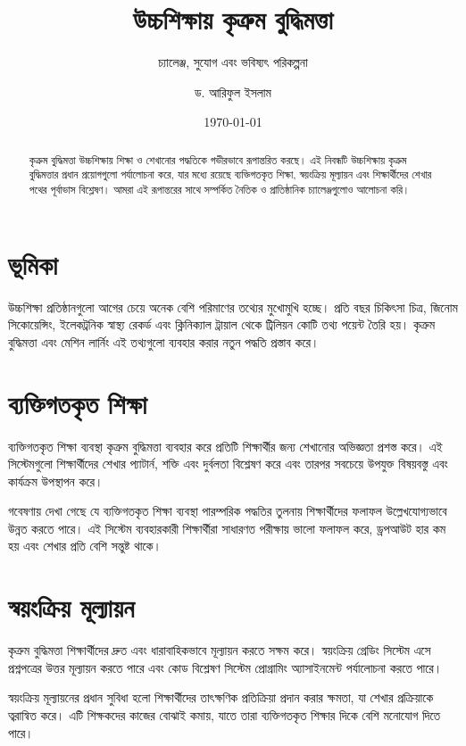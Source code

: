 \documentclass[
    language=bengali,
    doctype=article,
]{../../omnilatex}
\title{উচ্চশিক্ষায় কৃত্রুম বুদ্ধিমত্তা}
\subtitle{চ্যালেঞ্জ, সুযোগ এবং ভবিষ্যৎ পরিকল্পনা}
\author{ড. আরিফুল ইসলাম}
\date{\today}
\begin{document}
\maketitle

\begin{abstract}
কৃত্রুম বুদ্ধিমত্তা উচ্চশিক্ষায় শিক্ষা ও শেখানোর পদ্ধতিকে গভীরভাবে রূপান্তরিত করছে। এই নিবন্ধটি উচ্চশিক্ষায় কৃত্রুম বুদ্ধিমত্তার প্রধান প্রয়োগগুলো পর্যালোচনা করে, যার মধ্যে রয়েছে ব্যক্তিগতকৃত শিক্ষা, স্বয়ংক্রিয় মূল্যায়ন এবং শিক্ষার্থীদের শেখার পথের পূর্বাভাস বিশ্লেষণ। আমরা এই রূপান্তরের সাথে সম্পর্কিত নৈতিক ও প্রাতিষ্ঠানিক চ্যালেঞ্জগুলোও আলোচনা করি।
\end{abstract}

\section{ভূমিকা}
উচ্চশিক্ষা প্রতিষ্ঠানগুলো আগের চেয়ে অনেক বেশি পরিমাণের তথ্যের মুখোমুখি হচ্ছে। প্রতি বছর চিকিৎসা চিত্র, জিনোম সিকোয়েন্সিং, ইলেকট্রনিক স্বাস্থ্য রেকর্ড এবং ক্লিনিক্যাল ট্রায়াল থেকে ট্রিলিয়ন কোটি তথ্য পয়েন্ট তৈরি হয়। কৃত্রুম বুদ্ধিমত্তা এবং মেশিন লার্নিং এই তথ্যগুলো ব্যবহার করার নতুন পদ্ধতি প্রস্তাব করে।

\section{ব্যক্তিগতকৃত শিক্ষা}
ব্যক্তিগতকৃত শিক্ষা ব্যবস্থা কৃত্রুম বুদ্ধিমত্তা ব্যবহার করে প্রতিটি শিক্ষার্থীর জন্য শেখানোর অভিজ্ঞতা প্রশস্ত করে। এই সিস্টেমগুলো শিক্ষার্থীদের শেখার প্যাটার্ন, শক্তি এবং দুর্বলতা বিশ্লেষণ করে এবং তারপর সবচেয়ে উপযুক্ত বিষয়বস্তু এবং কার্যক্রম উপস্থাপন করে।

গবেষণায় দেখা গেছে যে ব্যক্তিগতকৃত শিক্ষা ব্যবস্থা পারম্পরিক পদ্ধতির তুলনায় শিক্ষার্থীদের ফলাফল উল্লেখযোগ্যভাবে উন্নত করতে পারে। এই সিস্টেম ব্যবহারকারী শিক্ষার্থীরা সাধারণত পরীক্ষায় ভালো ফলাফল করে, ড্রপআউট হার কম হয় এবং শেখার প্রতি বেশি সন্তুষ্ট থাকে।

\section{স্বয়ংক্রিয় মূল্যায়ন}
কৃত্রুম বুদ্ধিমত্তা শিক্ষার্থীদের দ্রুত এবং ধারাবাহিকভাবে মূল্যায়ন করতে সক্ষম করে। স্বয়ংক্রিয় গ্রেডিং সিস্টেম এসে প্রশ্নপত্রের উত্তর মূল্যায়ন করতে পারে এবং কোড বিশ্লেষণ সিস্টেম প্রোগ্রামিং অ্যাসাইনমেন্ট পর্যালোচনা করতে পারে।

স্বয়ংক্রিয় মূল্যায়নের প্রধান সুবিধা হলো শিক্ষার্থীদের তাৎক্ষণিক প্রতিক্রিয়া প্রদান করার ক্ষমতা, যা শেখার প্রক্রিয়াকে ত্বরান্বিত করে। এটি শিক্ষকদের কাজের বোঝাই কমায়, যাতে তারা ব্যক্তিগতকৃত শিক্ষার দিকে বেশি মনোযোগ দিতে পারে।
\end{document}
